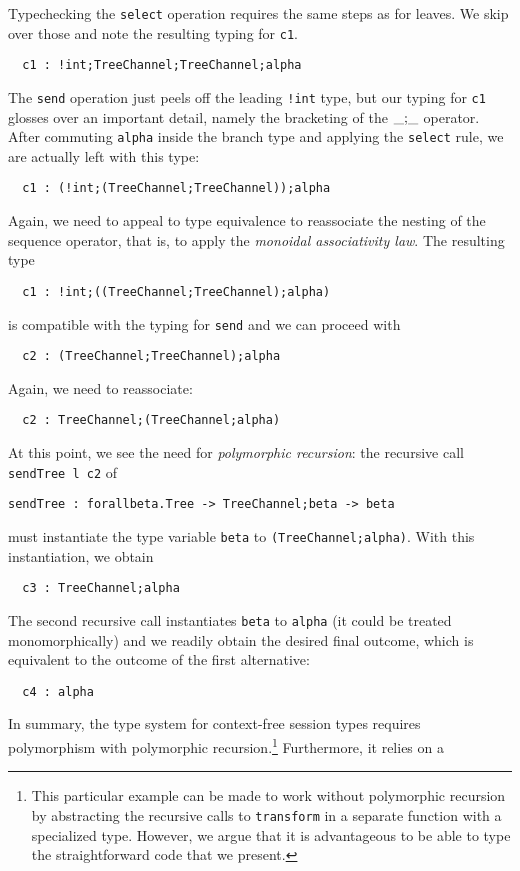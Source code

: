 Typechecking the \lstinline|select| operation requires the same steps
as for leaves. We skip over those and note the resulting typing for
\lstinline|c1|.
\begin{lstlisting}
  c1 : !int;TreeChannel;TreeChannel;alpha
\end{lstlisting}
The \lstinline|send| operation just peels off the leading
\lstinline{!int} type, but our typing for \lstinline|c1| glosses over
an important detail, namely the bracketing of the $\_{;}\_$
operator. After commuting \lstinline|alpha| inside the branch type and
applying the \lstinline|select| rule, we are actually left with this
type:
\begin{lstlisting}
  c1 : (!int;(TreeChannel;TreeChannel));alpha
\end{lstlisting}
Again, we need to appeal to type equivalence to reassociate the
nesting of the sequence operator, that is, to apply the \emph{monoidal
associativity law}. The resulting type
\begin{lstlisting}
  c1 : !int;((TreeChannel;TreeChannel);alpha)
\end{lstlisting}
is compatible with the typing for \lstinline|send| and we can
proceed with
\begin{lstlisting}
  c2 : (TreeChannel;TreeChannel);alpha
\end{lstlisting}
Again, we need to reassociate:
\begin{lstlisting}
  c2 : TreeChannel;(TreeChannel;alpha)
\end{lstlisting}
At this point, we see the need for \emph{polymorphic recursion}: the
recursive call \lstinline|sendTree l c2| of
\begin{lstlisting}
sendTree : forallbeta.Tree -> TreeChannel;beta -> beta
\end{lstlisting}
must instantiate the type variable \lstinline|beta| to
\lstinline{(TreeChannel;alpha)}. With this instantiation, we obtain
\begin{lstlisting}
  c3 : TreeChannel;alpha
\end{lstlisting}
The second recursive call instantiates \lstinline|beta| to
\lstinline|alpha| (it could be treated monomorphically) and we readily
obtain the desired final outcome, which is equivalent to the outcome
of the first alternative:
\begin{lstlisting}
  c4 : alpha
\end{lstlisting}
In summary, the type system for context-free session types requires
polymorphism with polymorphic recursion.\footnote{This particular example can
be made to work without polymorphic recursion by abstracting the
recursive calls to \lstinline|transform| in a separate function with a
specialized type. However, we argue that it is advantageous to be able
to type the straightforward code that we present.} Furthermore, it relies on a
